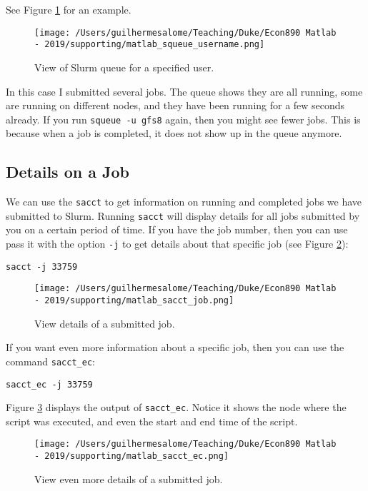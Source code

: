 \documentclass[12pt, a4paper]{article}
\begin{document}
See Figure \ref{fig:org5fe8d51} for an example.
\begin{figure}[H]
\centering
\texttt{[image: /Users/guilhermesalome/Teaching/Duke/Econ890 Matlab - 2019/supporting/matlab\_squeue\_username.png]}
\caption{\label{fig:org5fe8d51}
View of Slurm queue for a specified user.}
\end{figure}

In this case I submitted several jobs.
The queue shows they are all running, some are running on different nodes, and they have been running for a few seconds already.
If you run \texttt{squeue -u gfs8} again, then you might see fewer jobs.
This is because when a job is completed, it does not show up in the queue anymore.
\subsection{Details on a Job}
\label{sec:org8778f33}
We can use the \texttt{sacct} to get information on running and completed jobs we have submitted to Slurm.
Running \texttt{sacct} will display details for all jobs submitted by you on a certain period of time.
If you have the job number, then you can use pass it with the option \texttt{-j} to get details about that specific job (see Figure \ref{fig:orgc0e7528}):
\lstset{language=bash,label= ,caption= ,captionpos=b,firstnumber=1,numbers=left,style=bash}
\begin{lstlisting}
sacct -j 33759
\end{lstlisting}

\begin{figure}[H]
\centering
\texttt{[image: /Users/guilhermesalome/Teaching/Duke/Econ890 Matlab - 2019/supporting/matlab\_sacct\_job.png]}
\caption{\label{fig:orgc0e7528}
View details of a submitted job.}
\end{figure}

If you want even more information about a specific job, then you can use the command \texttt{sacct\_ec}:
\lstset{language=bash,label= ,caption= ,captionpos=b,firstnumber=1,numbers=left,style=bash}
\begin{lstlisting}
sacct_ec -j 33759
\end{lstlisting}

Figure \ref{fig:org16c74ce} displays the output of \texttt{sacct\_ec}.
Notice it shows the node where the script was executed, and even the start and end time of the script.

\begin{figure}[H]
\centering
\texttt{[image: /Users/guilhermesalome/Teaching/Duke/Econ890 Matlab - 2019/supporting/matlab\_sacct\_ec.png]}
\caption{\label{fig:org16c74ce}
View even more details of a submitted job.}
\end{figure}
\end{document}
